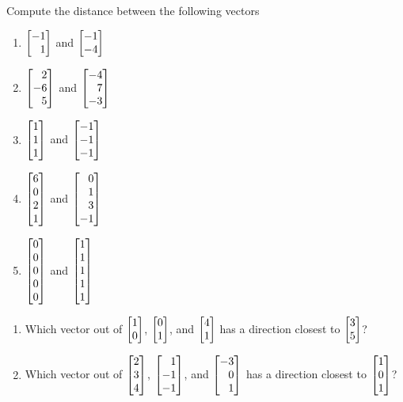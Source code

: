 \begin{exercises}
\begin{problist}
		\prob Compute the distance between the following vectors
		\begin{enumerate}
			\item $\mat{-1\\1}$ and $\mat{-1\\-4}$
			\item $\mat{2\\-6\\5}$ and $\mat{-4\\7\\-3}$
			\item $\mat{1\\1\\1}$ and $\mat{-1\\-1\\-1}$
			\item $\mat{6\\0\\2\\1}$ and $\mat{0\\1\\3\\-1}$
			\item $\mat{0\\0\\0\\0\\0}$ and $\mat{1\\1\\1\\1\\1}$
		\end{enumerate}

		\prob
		\begin{enumerate}
			\item Which vector out of $\mat{1\\0}$, $\mat{0\\1}$, and $\mat{4\\1}$
			has a direction closest to $\mat{3\\5}$?
			\item Which vector out of $\mat{2\\3\\4}$, $\mat{1\\-1\\-1}$, and $\mat{-3\\0\\1}$
			has a direction closest to $\mat{1\\0\\1}$?
		\end{enumerate}


\end{problist}
\end{exercises}

